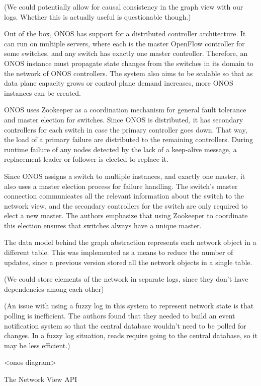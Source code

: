\documentclass[letterpaper,twocolumn,10pt]{article}
\begin{document}
(We could potentially allow for causal consistency in the graph view with our logs. Whether this is actually useful is questionable though.)

Out of the box, ONOS has support for a distributed controller architecture. It can run on multiple servers, where each is the master OpenFlow controller for some switches, and any switch has exactly one master controller. Therefore, an ONOS instance must propagate state changes from the switches in its domain to the network of ONOS controllers. The system also aims to be scalable so that as data plane capacity grows or control plane demand increases, more ONOS instances can be created.

ONOS uses Zookeeper as a coordination mechanism for general fault tolerance and master election for switches. Since ONOS is distributed, it has secondary controllers for each switch in case the primary controller goes down. That way, the load of a primary failure are distributed to the remaining controllers. During runtime failure of any nodes detected by the lack of a keep-alive message, a replacement leader or follower is elected to replace it.

Since ONOS assigns a switch to multiple instances, and exactly one master, it also uses a master election process for failure handling. The switch's master connection communicates all the relevant information about the switch to the network view, and the secondary controllers for the switch are only required to elect a new master. The authors emphasize that using Zookeeper to coordinate this election ensures that switches always have a unique master. 

The data model behind the graph abstraction represents each network object in a different table. This was implemented as a means to reduce the number of updates, since a previous version stored all the network objects in a single table. 

(We could store elements of the network in separate logs, since they don't have dependencies among each other) 

(An issue with using a fuzzy log in this system to represent network state is that polling is inefficient. The authors found that they needed to build an event notification system so that the central database wouldn't need to be polled for changes. In a fuzzy log situation, reads require going to the central database, so it may be less efficient.)

<onos diagram>

The Network View API
\end{document}
